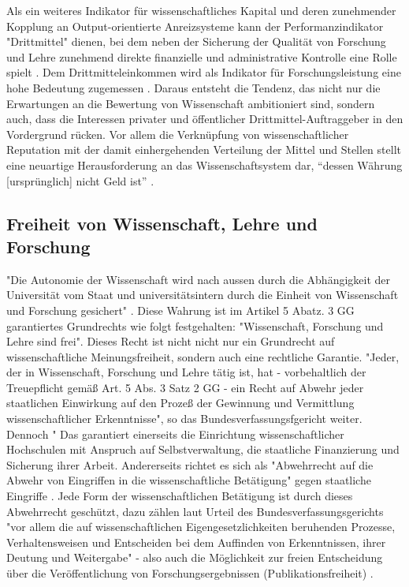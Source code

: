 Als ein weiteres Indikator für wissenschaftliches Kapital und deren zunehmender Kopplung an Output-orientierte Anreizsysteme kann der Performanzindikator "Drittmittel" \cite{Jansen_2007} dienen, bei dem neben der Sicherung der Qualität von Forschung und Lehre zunehmend direkte finanzielle und administrative Kontrolle eine Rolle spielt \cite{Barl_sius_2008}. Dem Drittmitteleinkommen wird als Indikator für Forschungsleistung eine hohe Bedeutung zugemessen \cite{Jansen_2007}. Daraus entsteht die Tendenz, das nicht nur die Erwartungen an die Bewertung von Wissenschaft ambitioniert sind, sondern auch, dass die Interessen privater und öffentlicher Drittmittel-Auftraggeber in den Vordergrund rücken. Vor allem die Verknüpfung von wissenschaftlicher Reputation mit der damit einhergehenden Verteilung der Mittel und Stellen stellt eine neuartige Herausforderung an das Wissenschaftsystem dar, “dessen Währung [ursprünglich] nicht Geld ist” \cite{hanekop_2006}. 

\subsection{Freiheit von Wissenschaft, Lehre und Forschung}

"Die Autonomie der Wissenschaft wird nach aussen durch die Abhängigkeit der Universität vom Staat und universitätsintern durch die Einheit von Wissenschaft und Forschung gesichert" \cite{Huber_2005}. Diese Wahrung ist im Artikel 5 Abatz. 3 GG garantiertes Grundrechts wie folgt festgehalten: "Wissenschaft, Forschung und Lehre sind frei". Dieses Recht ist nicht nicht nur ein Grundrecht auf wissenschaftliche Meinungsfreiheit, sondern auch eine rechtliche Garantie. "Jeder, der in Wissenschaft, Forschung und Lehre tätig ist, hat - vorbehaltlich der Treuepflicht gemäß Art. 5 Abs. 3 Satz 2 GG - ein Recht auf Abwehr jeder staatlichen Einwirkung auf den Prozeß der Gewinnung und Vermittlung wissenschaftlicher Erkenntnisse", so das Bundesverfassungsfgericht weiter. Dennoch " Das garantiert einerseits die Einrichtung wissenschaftlicher Hochschulen mit Anspruch auf Selbstverwaltung, die staatliche Finanzierung und Sicherung ihrer Arbeit. Andererseits richtet es sich als "Abwehrrecht auf die Abwehr von Eingriffen in die wissenschaftliche Betätigung" gegen staatliche Eingriffe \cite{mayen_grundrechte_forscher} \cite{spindler_2006_rechtloa}. Jede Form der wissenschaftlichen Betätigung ist durch dieses Abwehrrecht geschützt, dazu zählen laut Urteil des Bundesverfassungsgerichts "vor allem die auf wissenschaftlichen Eigengesetzlichkeiten beruhenden Prozesse, Verhaltensweisen und Entscheiden bei dem Auffinden von Erkenntnissen, ihrer Deutung und Weitergabe" - also auch die Möglichkeit zur freien Entscheidung über die Veröffentlichung von Forschungsergebnissen (Publikationsfreiheit) \cite{Fangerau_2014}. 

